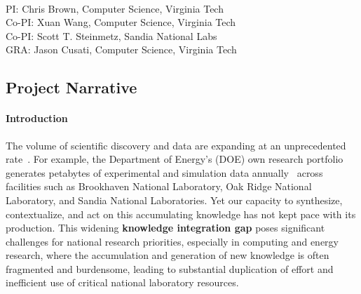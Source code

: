 \documentclass{files/proposalnsf}
\begin{document}
\newpage
{}

\begin{center}
    \large{\proposalEleven} \\ \vspace{0.5pt}
\footnotesize{PI: Chris Brown, Computer Science, Virginia Tech} \\
\footnotesize{Co-PI: Xuan Wang, Computer Science, Virginia Tech} \\
\footnotesize{Co-PI: Scott T. Steinmetz, Sandia National Labs} \\
\footnotesize{GRA: Jason Cusati, Computer Science, Virginia Tech}
\end{center}\vspace{-15pt}

\subsection*{Project Narrative}

\paragraph*{Introduction}
The volume of scientific discovery and data are expanding at an unprecedented rate~\cite{steiner2023exponential}. For example, the Department of Energy's (DOE) own research portfolio generates petabytes of experimental and simulation data annually~\cite{perabytes} across facilities such as Brookhaven National Laboratory, Oak Ridge National Laboratory, and Sandia National Laboratories. Yet our capacity to synthesize, contextualize, and act on this accumulating knowledge has not kept pace with its production. This widening \textbf{knowledge integration gap} poses significant challenges for national research priorities, especially in computing and energy research, where the accumulation and generation of new knowledge is often fragmented and burdensome, leading to substantial duplication of effort and inefficient use of critical national laboratory resources. 
\end{document}
